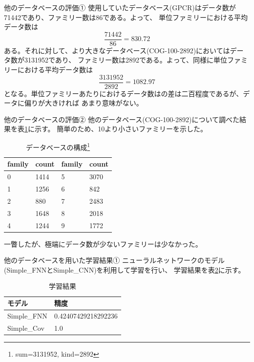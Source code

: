 \documentclass[dvipdfmx]{beamer}
\begin{document}
  \begin{frame}{他のデータベースの評価①}
    使用していたデータベース(GPCR)はデータ数が71442であり、ファミリー数は86である。よって、
    単位ファミリーにおける平均データ数は
    \[
      \frac{71442}{86} = 830.72
    \]
    ある。それに対して、より大きなデータベース(COG-100-2892)においてはデータ数が3131952であり、
    ファミリー数は2892である。よって、同様に単位ファミリーにおける平均データ数は
    \[
      \frac{3131952}{2892} = 1082.97
    \]
    となる。単位ファミリーあたりにおけるデータ数はの差は二百程度であるが、データに偏りが大きければ
    あまり意味がない。
  \end{frame}

  \begin{frame}{他のデータベースの評価②}
    他のデータベース(COG-100-2892)について調べた結果を表\ref{fig:bigger_composition}に示す。
    簡単のため、10より小さいファミリーを示した。
    \begin{table}
      \caption{データベースの構成\footnote{sum=3131952, kind=2892}}
      \label{fig:bigger_composition}
      \centering
      \begin{tabular}{llll}
        \hline
        family & count & family & count \\
        \hline \hline
        0 & 1414 & 5 & 3070 \\
        1 & 1256 & 6 & 842 \\
        2 & 880 & 7 & 2483 \\
        3 & 1648 & 8 & 2018 \\
        4 & 1244 & 9 & 1772 \\
        \hline
      \end{tabular}
    \end{table}
    一瞥したが、極端にデータ数が少ないファミリーは少なかった。
  \end{frame}

  \begin{frame}{他のデータベースを用いた学習結果①}
    ニューラルネットワークのモデル(Simple\_FNNとSimple\_CNN)を利用して学習を行い、
    学習結果を表\ref{tab:other_result}に示す。
    \begin{table}
      \caption{学習結果}
      \label{tab:other_result}
      \centering
      \begin{tabular}{ll}
        \hline
        モデル & 精度 \\
        \hline \hline
        Simple\_FNN & 0.42407429218292236 \\
        Simple\_Cov & 1.0 \\
        \hline
      \end{tabular}
    \end{table}
  \end{frame}
\end{document}
